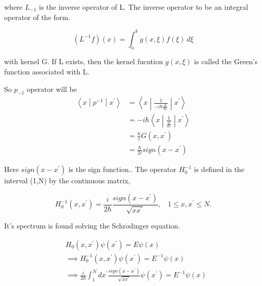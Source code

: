 \documentclass[12pt, letterpaper]{article}
\newcommand*{\1}{\hspace{1pt}}
\begin{document}
        where $L_{-1}$ is the inverse operator of L. The inverse operator to be an integral operator of the form.

        \begin{equation}
            \left(L^{-1}f\right)(x) = \int_{a}^{b} g(x,\xi ) f(\xi) \,d\xi 
        \end{equation}

        with kernel G. If L exists, then the kernel fucntion $g(x,\xi)$ is called the Green's function associated with L.

        So $p_{-1}$ operator will be
        \begin{equation}
            \begin{split}
                \left\langle x\middle|p^{-1}\middle|x^{'}\right\rangle &= \left\langle x\middle| \frac{1}{-i\hbar\frac{d}{dx}}\middle| x^{'}\right\rangle \\ 
                &= -i\hbar\left\langle x\middle| \frac{1}{\frac{d}{dx}}\middle| x^{'}\right\rangle \\
                &= \frac{\hbar}{i}G(x,x^{'}) \\ 
                &= \frac{\hbar}{2i} sign(x-x^{'})
            \end{split}
        \end{equation}

        Here $sign(x-x^{'})$ is the sign function.\cite{s10}. The operator $H_{0}^{-1}$ is defined in the interval (1,N) by the continuous matrix,

        \begin{equation}
            H_{0} ^{-1} (x,x^{'}) = \frac{i}{2\hbar} \frac{sign(x-x^{'})}{\sqrt{x x^{'}}},  \ \ \ \ 1\leqslant x , x^{'} \leqslant N.
        \end{equation}

        It's spectrum is found solving the Schr$\ddot{o}$dinger equation. 

        \begin{equation}
            \begin{split}
                &H_{0}(x,x^{'}) \psi(x^{'}) = E \psi(x) \\ 
                & \implies H_{0} ^{-1}(x,x^{'}) \psi(x^{'}) = E^{-1} \psi(x) \\ 
                & \implies \frac{i}{2\hbar} \int _{1}^{N} dx^{'}\frac{sign(x-x^{'})}{\sqrt{x x^{'}}} \psi(x^{'}) = E^{-1} \psi(x) \\ 
            \end{split}
        \end{equation}
\end{document}
